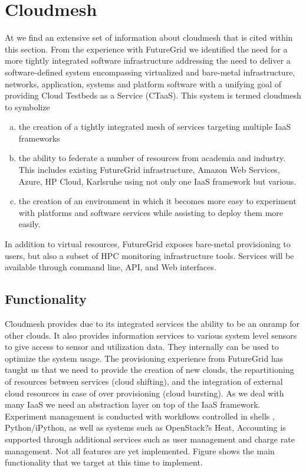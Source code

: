 \documentclass{article}
\newcommand{\FILE}[1]{}
\begin{document}
\FILE{cloudmesh.tex}

\section{Cloudmesh}\label{S:cloudmesh}

At \cite{github-cloudmesh}we find an extensive set of information about cloudmesh that is cited within this section. 
From the experience with FutureGrid we identified the need for a more tightly integrated software infrastructure addressing the need to deliver a software-defined system encompassing virtualized and bare-metal infrastructure, networks, application, systems and platform software with a unifying goal of providing Cloud Testbeds as a Service (CTaaS). This system is termed cloudmesh to symbolize 

\begin{enumerate}[(a)]

\item the creation of a tightly integrated mesh of services targeting multiple IaaS frameworks 

\item the ability to federate a number of resources from academia and industry. This includes existing FutureGrid infrastructure, Amazon Web Services, Azure, HP Cloud, Karlsruhe using not only one IaaS framework but various. 

\item the creation of an environment in which it becomes more easy to experiment with platforms and software services while assisting to deploy them more easily.  

\end{enumerate}

In addition to virtual resources, FutureGrid exposes bare-metal provisioning to users, but also a subset of HPC monitoring infrastructure tools. Services will be available through command line, API, and Web interfaces.

\subsection{Functionality}

Cloudmesh provides due to its integrated services the ability to be an onramp for other clouds. It also provides information services to various system level sensors to give access to sensor and utilization data. They internally can be used to optimize the system usage. The provisioning experience from FutureGrid has taught us that we need to provide the creation of new clouds, the repartitioning of resources between services (cloud shifting), and the integration of external cloud resources in case of over provisioning (cloud bursting). As we deal with many IaaS we need an abstraction layer on top of the IaaS framework. Experiment management is conducted with workflows controlled in shells \cite{cmd3}, Python/iPython, as well as systems such as OpenStack?s Heat, Accounting is supported through additional services such as user management and charge rate management. Not all features are yet implemented. Figure \label{F:cm-func} shows the main functionality that we target at this time to implement.
\end{document}
